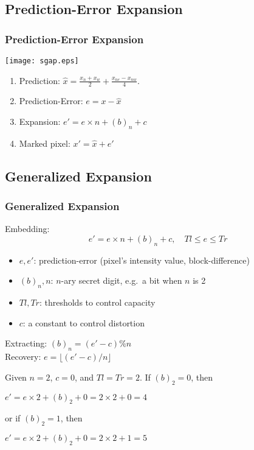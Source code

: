 \documentclass[slidestop,compress]{beamer}
\begin{document}
\subsection{Prediction-Error Expansion}
\begin{frame}
    \frametitle{Prediction-Error Expansion}
    \centering
    \texttt{[image: sgap.eps]}
    \begin{enumerate}
	\item Prediction: $\hat{x} = \frac{x_n + x_w}{2} + \frac{x_{ne} - x_{nw}}{4}. $
	\item Prediction-Error: $e = x - \hat{x}$
	\item Expansion: $e' = e \times n + (b)_n + c$
	\item Marked pixel: $x' = \hat{x} + e'$
    \end{enumerate}
\end{frame}

\subsection{Generalized Expansion}
\begin{frame}
    \frametitle{Generalized Expansion}
    Embedding: 
    \vspace{-0.3cm}
    \begin{equation}\label{eqn:gpe1}
      e' = e \times n + (b)_n + c, \quad Tl \le e \le Tr
    \end{equation}
    \vspace{-0.8cm}
    \begin{itemize}
	\item $e, e'$: prediction-error (pixel's intensity value, block-difference)
	\item $(b)_n, n$: $n$-ary secret digit, e.g.\ a bit when $n$ is 2 
	\item $Tl, Tr$: thresholds to control capacity 
	\item $c$: a constant to control distortion
    \end{itemize}
    Extracting: $(b)_n = (e' - c) \% n$	\\
    Recovery: $ e = \lfloor (e' - c) / n \rfloor $ \\
    \begin{example}
	Given $n=2$, $c=0$, and $Tl = Tr = 2$. If $(b)_2 = 0$, then \\
	\centerline{$e' = e \times 2 + (b)_2 + 0 = 2 \times 2 + 0 = 4$}
	or if $(b)_2 = 1$, then \\
	\centerline{$e' = e \times 2 + (b)_2 + 0 = 2 \times 2 + 1 = 5$}
    \end{example}
\end{frame}
\end{document}

